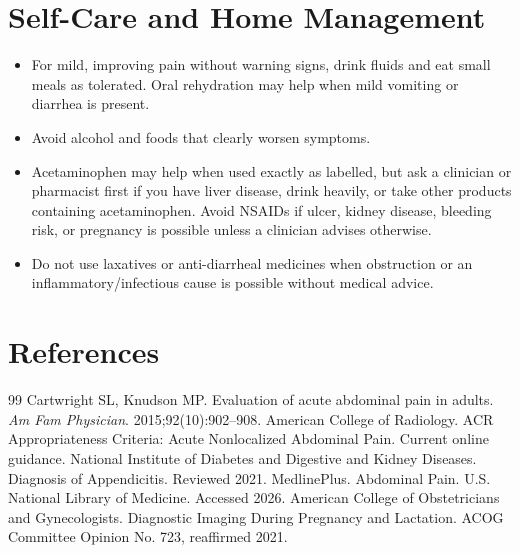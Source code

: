 \section*{Self-Care and Home Management}
\begin{itemize}
 \item For mild, improving pain without warning signs, drink fluids and eat small meals as tolerated. Oral rehydration may help when mild vomiting or diarrhea is present.
 \item Avoid alcohol and foods that clearly worsen symptoms.
 \item Acetaminophen may help when used exactly as labelled, but ask a clinician or pharmacist first if you have liver disease, drink heavily, or take other products containing acetaminophen. Avoid NSAIDs if ulcer, kidney disease, bleeding risk, or pregnancy is possible unless a clinician advises otherwise.
 \item Do not use laxatives or anti-diarrheal medicines when obstruction or an inflammatory/infectious cause is possible without medical advice.
\end{itemize}

\section*{References}
\begin{thebibliography}{99}
 Cartwright SL, Knudson MP. Evaluation of acute abdominal pain in adults. \textit{Am Fam Physician}. 2015;92(10):902--908.
 American College of Radiology. ACR Appropriateness Criteria: Acute Nonlocalized Abdominal Pain. Current online guidance.
 National Institute of Diabetes and Digestive and Kidney Diseases. Diagnosis of Appendicitis. Reviewed 2021.
 MedlinePlus. Abdominal Pain. U.S. National Library of Medicine. Accessed 2026.
 American College of Obstetricians and Gynecologists. Diagnostic Imaging During Pregnancy and Lactation. ACOG Committee Opinion No. 723, reaffirmed 2021.
\end{thebibliography}
